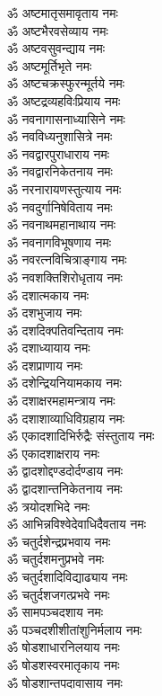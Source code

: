 \begin{multicols}{2}
\begin{flushleft}
ॐ अष्टमातृसमावृताय नमः\\
ॐ अष्टभैरवसेव्याय नमः\\
ॐ अष्टवसुवन्द्याय नमः\\
ॐ अष्टमूर्तिभृते नमः\\
ॐ अष्टचक्रस्फुरन्मूर्तये नमः\hfill{}\\
ॐ अष्टद्रव्यहविःप्रियाय नमः\\
ॐ नवनागासनाध्यासिने नमः\\
ॐ नवविध्यनुशासित्रे नमः\\
ॐ नवद्वारपुराधाराय नमः\\
ॐ नवद्वारनिकेतनाय नमः\\
ॐ नरनारायणस्तुत्याय नमः\\
ॐ नवदुर्गानिषेविताय नमः\\
ॐ नवनाथमहानाथाय नमः\\
ॐ नवनागविभूषणाय नमः\\
ॐ नवरत्नविचित्राङ्गाय नमः\hfill{}\\
ॐ नवशक्तिशिरोधृताय नमः\\
ॐ दशात्मकाय नमः\\
ॐ दशभुजाय नमः\\
ॐ दशदिक्पतिवन्दिताय नमः\\
ॐ दशाध्यायाय नमः\\
ॐ दशप्राणाय नमः\\
ॐ दशेन्द्रियनियामकाय नमः\\
ॐ दशाक्षरमहामन्त्राय नमः\\
ॐ दशाशाव्याधिविग्रहाय नमः\\
ॐ एकादशादिभिर्रुद्रैः संस्तुताय नमः\hfill{}\\
ॐ एकादशाक्षराय नमः\\
ॐ द्वादशोद्दण्डदोर्दण्डाय नमः\\
ॐ द्वादशान्तनिकेतनाय नमः\\
ॐ त्रयोदशभिदे नमः\\
ॐ आभिन्नविश्वेदेवाधिदैवताय नमः\\
ॐ चतुर्दशेन्द्रप्रभवाय नमः\\
ॐ चतुर्दशमनुप्रभवे नमः\\
ॐ चतुर्दशादिविद्याढ्याय नमः\\
ॐ चतुर्दशजगत्प्रभवे नमः\\
ॐ सामपञ्चदशाय नमः\hfill{}\\
ॐ पञ्चदशीशीतांशुनिर्मलाय नमः\\
ॐ षोडशाधारनिलयाय नमः\\
ॐ षोडशस्वरमातृकाय नमः\\
ॐ षोडशान्तपदावासाय नमः\\

\end{flushleft}
\end{multicols}
